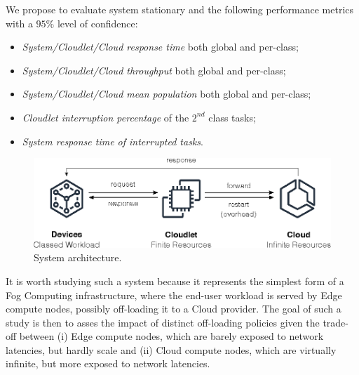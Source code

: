 We propose to evaluate system stationary and the following performance metrics with a $95\%$ level of confidence:

\begin{itemize}
	\item \textit{System/Cloudlet/Cloud response time} both global and per-class;
	
	\item \textit{System/Cloudlet/Cloud throughput} both global and per-class;
	
	\item \textit{System/Cloudlet/Cloud mean population} both global and per-class;
	
	\item \textit{Cloudlet interruption percentage} of the $2^{nd}$ class tasks;
	
	\item \textit{System response time of interrupted tasks}.
\end{itemize}

\begin{figure}
	\includegraphics[width=\columnwidth]{fig/architecture}
	\caption{System architecture.}
	\label{fig:system-architecture}
\end{figure}

It is worth studying such a system because it represents the simplest form of a Fog Computing infrastructure, where the end-user workload is  served by Edge compute nodes,  possibly off-loading it to a Cloud provider. The goal of such a study is then to asses the impact of distinct off-loading policies given the trade-off between (i) Edge compute nodes, which are barely exposed to network latencies, but hardly scale and (ii) Cloud compute nodes,  which are virtually infinite, but more exposed to network latencies.